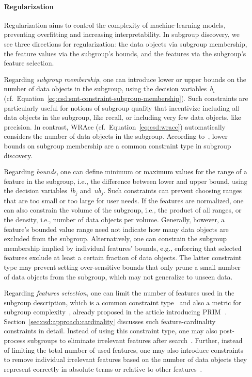 \documentclass{article}
\theoremstyle{definition}
\begin{document}
\paragraph{Regularization}

Regularization aims to control the complexity of machine-learning models, preventing overfitting and increasing interpretability.
In subgroup discovery, we see three directions for regularization:
the data objects via subgroup membership, the feature values via the subgroup's bounds, and the features via the subgroup's feature selection.

Regarding \emph{subgroup membership}, one can introduce lower or upper bounds on the number of data objects in the subgroup, using the decision variables~$b_i$ (cf.~Equation~\ref{eq:csd:smt-constraint-subgroup-membership}).
Such constraints are particularly useful for notions of subgroup quality that incentivize including all data objects in the subgroup, like recall, or including very few data objects, like precision.
In contrast, WRAcc (cf.~Equation~\ref{eq:csd:wracc}) automatically considers the number of data objects in the subgroup.
According to~\cite{meeng2021real}, lower bounds on subgroup membership are a common constraint type in subgroup discovery.

Regarding \emph{bounds}, one can define minimum or maximum values for the range of a feature in the subgroup, i.e., the difference between lower and upper bound, using the decision variables~$\mathit{lb}_j$ and~$\mathit{ub}_j$.
Such constraints can prevent choosing ranges that are too small or too large for user needs.
If the features are normalized, one can also constrain the volume of the subgroup, i.e., the product of all ranges, or the density, i.e., number of data objects per volume.
Generally, however, a feature's bounded value range need not indicate how many data objects are excluded from the subgroup.
Alternatively, one can constrain the subgroup membership implied by individual features' bounds, e.g., enforcing that selected features exclude at least a certain fraction of data objects.
The latter constraint type may prevent setting over-sensitive bounds that only prune a small number of data objects from the subgroup, which may not generalize to unseen data.

Regarding \emph{features selection}, one can limit the number of features used in the subgroup description, which is a common constraint type~\cite{meeng2021real} and also a metric for subgroup complexity~\cite{helal2016subgroup, herrera2011overview, ventura2018subgroup}, already proposed in the article introducing PRIM~\cite{friedman1999bump}.
Section~\ref{sec:csd:approach:cardinality} discusses such feature-cardinality constraints in detail.
Instead of using this constraint type, one may also post-process subgroups to eliminate irrelevant features after search~\cite{friedman1999bump}.
Further, instead of limiting the total number of used features, one may also introduce constraints to remove individual irrelevant features based on the number of data objects they represent correctly in absolute terms or relative to other features~\cite{lavrac2006relevancy}.
\end{document}
